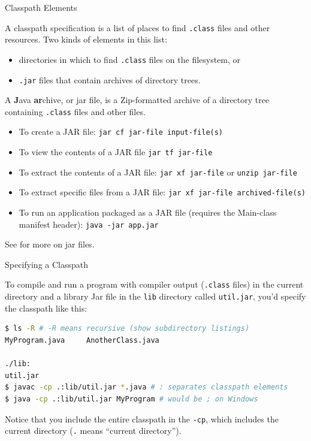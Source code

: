 \documentclass{beamer}
\begin{document}
\begin{frame}[fragile]{Classpath Elements}

\vspace{-.05in}
A classpath specification is a list of places to find {\tt .class} files and other resources.  Two kinds of elements in this list:
\vspace{-.05in}
\begin{itemize}
\item directories in which to find {\tt .class} files on the filesystem, or
\item {\tt .jar} files that contain archives of directory trees.
\end{itemize}

A {\bf J}ava {\bf ar}chive, or jar file, is a Zip-formatted archive of a directory tree containing {\tt .class} files and other files.
\vspace{-.05in}
\begin{itemize}
\item To create a JAR file: {\tt jar cf jar-file input-file(s)}
\item To view the contents of a JAR file {\tt jar tf jar-file}
\item To extract the contents of a JAR file: {\tt jar xf jar-file} or {\tt unzip jar-file}
\item To extract specific files from a JAR file: {\tt jar xf jar-file archived-file(s)}
\item To run an application packaged as a JAR file (requires the Main-class manifest header): {\tt java -jar app.jar}
\end{itemize}
See
 for more on jar files.

\end{frame}

\begin{frame}[fragile]{Specifying a Classpath}


To compile and run a program with compiler output ({\tt .class} files) in the current directory and a library Jar file in the {\tt lib} directory called {\tt util.jar}, you'd specify the classpath like this:
\vspace{-.05in}
\begin{lstlisting}[language=bash]
$ ls -R # -R means recursive (show subdirectory listings)
MyProgram.java     AnotherClass.java

./lib:
util.jar
$ javac -cp .:lib/util.jar *.java # : separates classpath elements
$ java -cp .:lib/util.jar MyProgram # would be ; on Windows
\end{lstlisting}

Notice that you include the entire classpath in the {\tt -cp}, which includes the current directory ({\tt .} means ``current directory'').

\end{frame}
\end{document}
